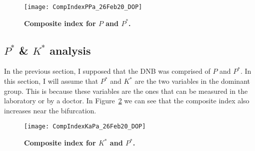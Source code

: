 \documentclass[12pt,twoside]{book}
\begin{document}
\begin{figure}[h]
\centering
\texttt{[image: CompIndexPPa\_26Feb20\_DOP]}
\caption{\textbf{Composite index for $P$ and $P^*$.}}
\label{PaP}
\end{figure}

\clearpage

\subsection*{$P^*$ \& $K^*$ analysis}

In the previous section, I supposed that the DNB was comprised of $P$ and $P^*$. In this section, I will assume that $P^*$ and $K^*$ are the two variables in the dominant group. This is because these variables are the ones that can be measured in the laboratory or by a doctor. In Figure~\ref{PaKa} we can see that the composite index also increases near the bifurcation. 

\begin{figure}[h]
\centering
\texttt{[image: CompIndexKaPa\_26Feb20\_DOP]}
\caption{\textbf{Composite index for $K^*$ and $P^*$.}}
\label{PaKa}
\end{figure}
\end{document}
